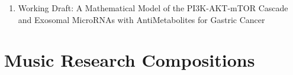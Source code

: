 \documentclass{ResumeDesignFormat2}
\begin{document}
\begin{enumerate}
\item Working Draft: A Mathematical Model of the PI3K-AKT-mTOR Cascade and Exosomal MicroRNAs with AntiMetabolites for Gastric Cancer
\end{enumerate}
\section{Music Research Compositions}

\begin{enumerate}
\end{enumerate}

\end{document}
